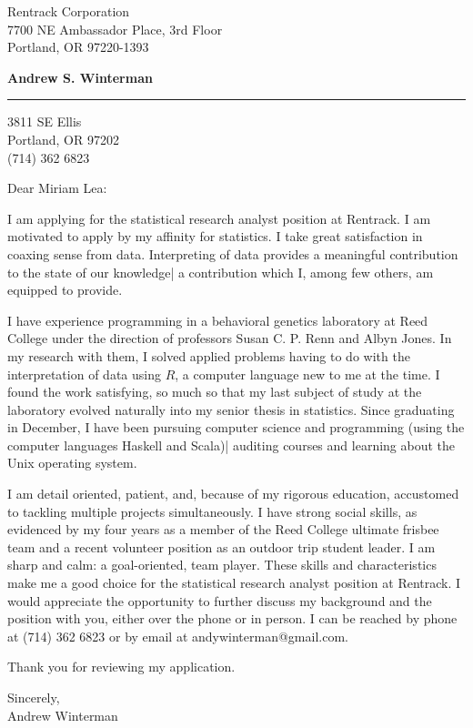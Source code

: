 \documentclass[11pt]{letter} %
\begin{document}
\longindentation=0pt                       %
\let\raggedleft\raggedright                %


\begin{letter}{
Rentrack Corporation\\
7700 NE Ambassador Place, 3rd Floor\\
Portland, OR 97220-1393}

\begin{center}
\large \bf{Andrew S. Winterman} \end{center}
\medskip\hrule height 1pt
\begin{center}
3811 SE Ellis \\ Portland, OR 97202 \\ (714) 362 6823
\end{center}  


\opening{Dear Miriam Lea:} 


I am applying for the statistical research analyst position
at %
Rentrack. I am motivated to apply by my affinity for statistics. I
take great satisfaction in coaxing sense from data. Interpreting of data
provides  a meaningful contribution to the state of our knowledge| a
contribution which I, among few others, am equipped to provide.
 
I have experience programming in a behavioral genetics laboratory at
Reed College under the direction of professors Susan C. P. Renn and
Albyn Jones. In my research with them, I solved applied problems
having to do with the interpretation of data using $R$, a computer
language new to me at the time. I found the work satisfying, so much
so that my last subject of study at the laboratory evolved naturally
into my senior thesis in statistics. Since graduating in December, I
have been pursuing computer science and programming (using  the
computer languages Haskell and Scala)| auditing courses and learning
about the Unix operating system.
 
I am detail oriented, patient, and, because of my rigorous education,
accustomed to tackling multiple projects simultaneously. I have strong
social skills, as evidenced by my four years as a member of the Reed
College ultimate frisbee team and a recent volunteer position as an
outdoor trip student leader. I am sharp and calm: a goal-oriented, team
player. These skills and characteristics make me a good choice for the
statistical research analyst position at %
Rentrack. I would appreciate the opportunity to further discuss my
background and the position with you, either over the phone or in
person. I can be reached by phone at (714) 362 6823 or by email at
andywinterman@gmail.com.

Thank you for reviewing my application.

Sincerely, \\
Andrew Winterman

\end{letter}
 
\end{document}
